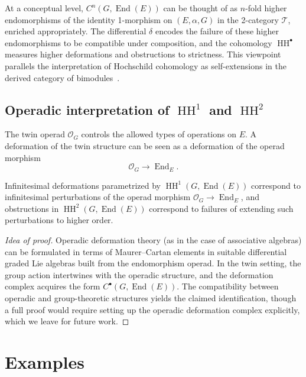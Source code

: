 \documentclass[11pt,a4paper]{article}
\numberwithin{equation}{section}
\DeclareMathOperator{\End}{End}
\DeclareMathOperator{\HH}{HH}
\newcommand{\TwinSpace}{(E,\alpha,G)}
\newcommand{\Twin}{\mathcal{T}}
\newcommand{\Cochain}{C}
\newcommand{\diff}{\delta}
\begin{document}
	\begin{remark}
		At a conceptual level, $\Cochain^n(G,\End(E))$ can be thought of as $n$-fold higher endomorphisms
		of the identity 1-morphism on $\TwinSpace$ in the 2-category $\Twin$, enriched appropriately.
		The differential $\diff$ encodes the failure of these higher endomorphisms to be compatible under
		composition, and the cohomology $\HH^\bullet$ measures higher deformations and obstructions to strictness.
		This viewpoint parallels the interpretation of Hochschild cohomology as self-extensions in the derived
		category of bimodules~\cite{Weibel1994}.
	\end{remark}
	
	\subsection{Operadic interpretation of $\HH^1$ and $\HH^2$}
	
	The twin operad $\mathcal{O}_G$ controls the allowed types of operations on $E$. A deformation of the
	twin structure can be seen as a deformation of the operad morphism
	\[
	\mathcal{O}_G \to \End_E.
	\]
	
	\begin{proposition}[Heuristic]
		Infinitesimal deformations parametrized by $\HH^1(G,\End(E))$ correspond to infinitesimal perturbations
		of the operad morphism $\mathcal{O}_G\to\End_E$, and obstructions in $\HH^2(G,\End(E))$ correspond to failures
		of extending such perturbations to higher order.
	\end{proposition}
	
	\begin{proof}[Idea of proof]
		Operadic deformation theory (as in the case of associative algebras) can be formulated in terms of Maurer--Cartan 
		elements in suitable differential graded Lie algebras built from the endomorphism operad.
		In the twin setting, the group action intertwines with the operadic structure, and the deformation 
		complex acquires the form $\Cochain^\bullet(G,\End(E))$. The compatibility between operadic and group-theoretic 
		structures yields the claimed identification, though a full proof would require setting up the operadic deformation
		complex explicitly, which we leave for future work.
	\end{proof}
	
	\section{Examples}
	\label{sec:examples}
	
\end{document}
